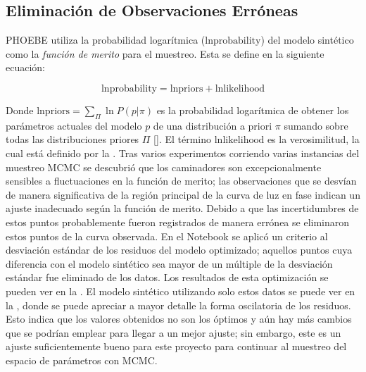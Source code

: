 \subsection{Eliminación de Observaciones Erróneas}

PHOEBE utiliza la probabilidad logarítmica ($\mathrm{lnprobability}$) del modelo
sintético como la \textit{función de merito} para el muestreo. Esta se define en
la siguiente ecuación:

\begin{eqfloat}[!ht]
	\centering
	\begin{equation}
		\textrm{lnprobability} = \textrm{lnpriors} + \textrm{lnlikelihood}
	\end{equation}
\end{eqfloat}

Donde $\mathrm{lnpriors} = \sum_{\Pi} \ln{P(p | \pi)}$ es la probabilidad
logarítmica de obtener los parámetros actuales del modelo $p$ de una
distribución a priori $\pi$ sumando sobre todas las distribuciones priores $\Pi$
[]. El
término $\mathrm{lnlikelihood}$ es la verosimilitud, la cual está definido por
la . Tras varios experimentos corriendo
varias instancias del muestreo MCMC se descubrió que los caminadores son
excepcionalmente sensibles a fluctuaciones en la función de merito; las
observaciones que se desvían de manera significativa de la región principal de
la curva de luz en fase indican un ajuste inadecuado según la función de merito.
Debido a que las incertidumbres de estos puntos probablemente fueron registrados
de manera errónea se eliminaron estos puntos de la curva observada. En el
Notebook
\href{https://github.com/KnightIV/UANL_MAPTA_Observaciones/blob/main/analisis/phoebe_model/sampling/remove-bad-observations.ipynb}{}
se aplicó un criterio al desviación estándar de los residuos del modelo
optimizado; aquellos puntos cuya diferencia con el modelo sintético sea mayor de
un múltiple de la desviación estándar fue eliminado de los datos. Los resultados
de esta optimización se pueden ver en la
. El modelo sintético utilizando
solo estos datos se puede ver en la
, donde se puede apreciar a
mayor detalle la forma oscilatoria de los residuos. Esto indica que los valores
obtenidos no son los óptimos y aún hay más cambios que se podrían emplear para
llegar a un mejor ajuste; sin embargo, este es un ajuste suficientemente bueno
para este proyecto para continuar al muestreo del espacio de parámetros con
MCMC.

